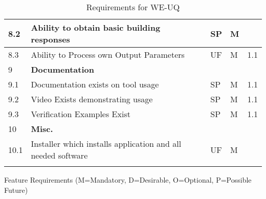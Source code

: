 \begin{longtable}{| p{} | p{} | p{} | p{} |  p{} |}
    8.2 & Ability to obtain basic building responses & SP & M &   \\ \hline
    8.3 & Ability to Process own Output Parameters & UF & M & 1.1  \\ \hline
    9 & \textbf{Documentation} &  &  \\ \hline
    9.1 & Documentation exists on tool usage & SP & M & 1.1  \\ \hline
    9.2 & Video Exists demonstrating usage & SP & M & 1.1  \\ \hline
    9.3 & Verification Examples Exist & SP & M & 1.1  \\ \hline
    10 & \textbf{Misc.} &  &  \\ \hline
    10.1 & Installer  which installs application and all needed software & UF & M &   \\ \hline
	\bottomrule 
\caption{Requirements for WE-UQ}
  \label{tab:featureRequirements}                 
\end{longtable}

Feature Requirements (M=Mandatory, D=Desirable, O=Optional, P=Possible Future)

